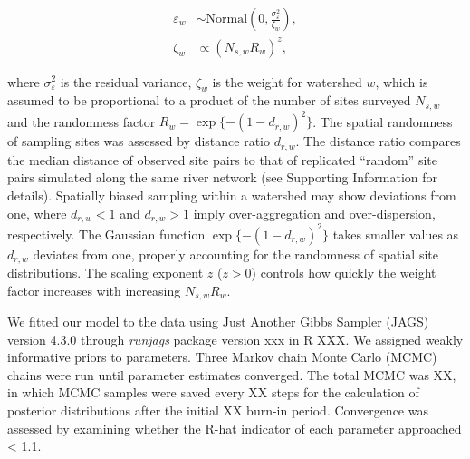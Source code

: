 \documentclass[11pt, class=article, crop=false]{standalone}
\begin{document}
\begin{align}
    \varepsilon_w &\sim \mbox{Normal}(0, \frac{\sigma_{\varepsilon}^2}{\zeta_w}),\\
    \zeta_w &\propto (N_{s, w} R_w)^{z},
\end{align}

where $\sigma_{\varepsilon}^2$ is the residual variance, $\zeta_w$ is the weight for watershed $w$, which is assumed to be proportional to a product of the number of sites surveyed $N_{s,w}$ and the randomness factor $R_w = \exp\{-(1 - d_{r,w})^2\}$.
The spatial randomness of sampling sites was assessed by distance ratio $d_{r, w}$.
The distance ratio compares the median distance of observed site pairs to that of replicated ``random'' site pairs simulated along the same river network (see Supporting Information for details).
Spatially biased sampling within a watershed may show deviations from one, where $d_{r, w} < 1$ and $d_{r, w} > 1$ imply over-aggregation and over-dispersion, respectively.
The Gaussian function $\exp\{-(1 - d_{r, w})^2\}$ takes smaller values as $d_{r, w}$ deviates from one, properly accounting for the randomness of spatial site distributions.
The scaling exponent $z$ ($z > 0$) controls how quickly the weight factor increases with increasing $N_{s, w} R_w$.

We fitted our model to the data using Just Another Gibbs Sampler (JAGS) version 4.3.0 through \textit{runjags} package version xxx in R XXX.
We assigned weakly informative priors to parameters.
Three Markov chain Monte Carlo (MCMC) chains were run until parameter estimates
converged.
The total MCMC was XX, in which MCMC samples were saved every XX steps for the calculation of posterior distributions after the initial XX burn-in period. 
Convergence was assessed by examining whether the R-hat indicator of each parameter approached < 1.1.
\end{document}
